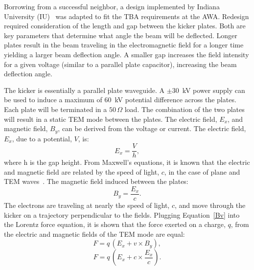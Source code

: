 Borrowing from a successful neighbor, a design implemented by Indiana University (IU)~\cite{iukicker}
was adapted to fit the TBA requirements at the AWA. Redesign required consideration
of the length and gap between the kicker plates. Both are key parameters that determine 
what angle the beam will be deflected. Longer plates result in the beam traveling 
in the electromagnetic field for a longer time yielding a larger beam deflection angle. 
A smaller gap increases the field intensity for a given voltage (similar to a parallel plate 
capacitor), increasing the beam deflection angle. 


The kicker is essentially a parallel plate waveguide. 
A $\pm$\SI{30}{kV} power supply can be used to induce a maximum of \SI{60}{kV} potential difference 
across the plates. Each plate will be terminated in a $50\,\Omega$ load.  
The combination of the two plates will result in a static TEM mode 
between the plates. The electric field, $E_x$, and magnetic field, $B_y$,
can be derived from the voltage or current. The electric field, $E_x$, due to a potential, $V$, is: 
\begin{equation}
E_x=\frac{V}{h},
\end{equation}
where h is the gap height. From Maxwell's equations, it is known that the electric and magnetic 
field are related by the speed of light, $c$, in the case of plane and TEM waves~\cite{pozar}. 
The magnetic field induced between the plates: 
\begin{equation}
B_y=\frac{E_x}{c}.
\label{Bv}
\end{equation}
The electrons are traveling at nearly the speed of light, $c$, and move through the kicker on a 
trajectory perpendicular to the fields.  Plugging Equation~\ref{Bv} into the Lorentz force equation, 
it is shown that the force exerted on a charge, $q$, 
from the electric and magnetic fields of the TEM mode are equal: 
\begin{equation}
F=q\,(E_x+v\times B_y),
\end{equation}
\begin{equation}
	F = q \,\left(E_x+c\times \frac{E_x}{c}\right).
\end{equation}

